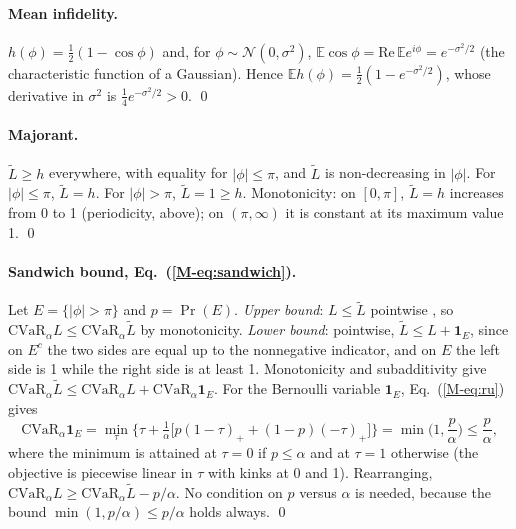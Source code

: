 \documentclass[aps,pra,onecolumn,notitlepage,superscriptaddress,nofootinbib,floatfix]{revtex4-2}
\newcommand{\cvar}{\mathrm{CVaR}}
\newcommand{\E}{\mathbb{E}}
\newcommand{\Lt}{\widetilde L}
\begin{document}
\paragraph*{Mean infidelity.} $h(\phi)=\tfrac12(1-\cos\phi)$ and, for
$\phi\sim\mathcal N(0,\sigma^2)$, $\E\cos\phi=\mathrm{Re}\,\E e^{i\phi}=e^{-\sigma^2/2}$
(the characteristic function of a Gaussian). Hence
$\E h(\phi)=\tfrac12(1-e^{-\sigma^2/2})$, whose derivative in $\sigma^2$ is
$\tfrac14e^{-\sigma^2/2}>0$. \qed

\paragraph*{Majorant.} $\Lt\ge h$ everywhere, with equality for $|\phi|\le\pi$, and $\Lt$ is non-decreasing in $|\phi|$. For $|\phi|\le\pi$, $\Lt=h$. For
$|\phi|>\pi$, $\Lt=1\ge h$. Monotonicity: on $[0,\pi]$, $\Lt=h$ increases
from 0 to 1 (periodicity, above); on $(\pi,\infty)$ it is constant at
its maximum value 1. \qed

\paragraph*{Sandwich bound, Eq.~(\ref{M-eq:sandwich}).} Let $E=\{|\phi|>\pi\}$ and $p=\Pr(E)$.
\emph{Upper bound}: $L\le\Lt$ pointwise , so
$\cvar_\alpha L\le\cvar_\alpha\Lt$ by monotonicity. \emph{Lower bound}:
pointwise, $\Lt\le L+\mathbf 1_E$, since on $E^c$ the two sides are equal
up to the nonnegative indicator, and on $E$ the left side is 1 while the right
side is at least 1. Monotonicity and subadditivity give
$\cvar_\alpha\Lt\le\cvar_\alpha L+\cvar_\alpha\mathbf 1_E$. For the Bernoulli
variable $\mathbf 1_E$, Eq.~(\ref{M-eq:ru}) gives
\[
\cvar_\alpha\mathbf 1_E=\min_\tau\Big\{\tau+\tfrac1\alpha\big[p(1-\tau)_++(1-p)(-\tau)_+\big]\Big\}
=\min\!\Big(1,\frac p\alpha\Big)\le\frac p\alpha ,
\]
where the minimum is attained at $\tau=0$ if $p\le\alpha$ and at $\tau=1$
otherwise (the objective is piecewise linear in $\tau$ with kinks at 0 and 1).
Rearranging,
$\cvar_\alpha L\ge\cvar_\alpha\Lt-p/\alpha$. No condition on $p$ versus
$\alpha$ is needed, because the bound $\min(1,p/\alpha)\le p/\alpha$ holds
always. \qed
\end{document}
